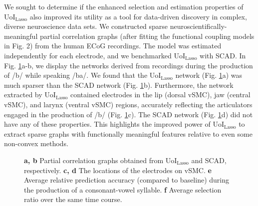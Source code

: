 \documentclass[letterpaper, 10 pt, conference]{ieeeconf}  %
\begin{document}
We sought to determine if the enhanced selection and estimation properties of UoI$_{\text{Lasso}}$ also improved its utility as a tool for data-driven discovery in complex, diverse neuroscience data sets. We constructed sparse neuroscientifically-meaningful partial correlation graphs (after fitting the functional coupling models in Fig. 2) from the human ECoG recordings. The model was estimated independently for each electrode, and we benchmarked UoI$_{\text{Lasso}}$ with SCAD. In Fig. \ref{fig:vsmc}a-b, we display the networks derived from recordings during the production of /b/ while speaking /ba/. We found that the UoI$_{\text{Lasso}}$ network (Fig. \ref{fig:vsmc}a) was much sparser than the SCAD network (Fig. \ref{fig:vsmc}b). Furthermore, the network extracted by UoI$_{\text{Lasso}}$ contained electrodes in the lip (dorsal vSMC), jaw (central vSMC), and larynx (ventral vSMC) regions, accurately reflecting the articulators engaged in the production of /b/ (Fig. \ref{fig:vsmc}c). The SCAD network (Fig. \ref{fig:vsmc}d) did not have any of these properties. This highlights the improved power of UoI$_{\text{Lasso}}$ to extract sparse graphs with functionally meaningful features relative to even some non-convex methods.
\begin{figure}[t!]
    \centering
    \caption{\textbf{a, b} Partial correlation graphs obtained from UoI$_{\text{Lasso}}$ and SCAD, respectively. \textbf{c, d} The locations of the electrodes on vSMC. \textbf{e} Average relative prediction accuracy (compared to baseline) during the production of a consonant-vowel syllable. \textbf{f} Average selection ratio over the same time course.}
    \label{fig:vsmc}
\end{figure}
\end{document}
